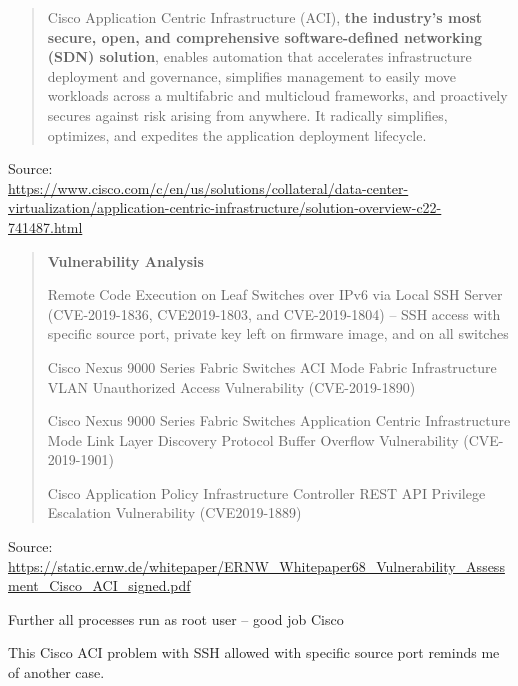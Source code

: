 \documentclass[Screen16to9,17pt]{foils}
\begin{document}


\begin{quote}\footnotesize
Cisco Application Centric Infrastructure (ACI), {\bf the industry’s most secure, open, and comprehensive software-defined networking (SDN) solution}, enables automation that accelerates infrastructure deployment and governance, simplifies management to easily move workloads across a multifabric and multicloud frameworks, and proactively secures against risk arising from anywhere. It radically simplifies, optimizes, and expedites the application deployment lifecycle.
\end{quote}
Source:\\ {\scriptsize\url{https://www.cisco.com/c/en/us/solutions/collateral/data-center-virtualization/application-centric-infrastructure/solution-overview-c22-741487.html}}



\begin{quote}{\bf
Vulnerability Analysis}
\begin{list2}
\item Remote Code Execution on Leaf Switches over IPv6 via Local SSH Server (CVE-2019-1836, CVE2019-1803, and CVE-2019-1804) -- SSH access with specific source port, private key left on firmware image, and on all switches
\item Cisco Nexus 9000 Series Fabric Switches ACI Mode Fabric Infrastructure VLAN Unauthorized Access
Vulnerability (CVE-2019-1890)
\item Cisco Nexus 9000 Series Fabric Switches Application Centric Infrastructure Mode Link Layer Discovery
Protocol Buffer Overflow Vulnerability (CVE-2019-1901)
\item Cisco Application Policy Infrastructure Controller REST API Privilege Escalation Vulnerability (CVE2019-1889)
\end{list2}
\end{quote}
Source: \url{https://static.ernw.de/whitepaper/ERNW_Whitepaper68_Vulnerability_Assessment_Cisco_ACI_signed.pdf}

Further all processes run as root user -- good job Cisco


This Cisco ACI problem with SSH allowed with specific source port reminds me of another case.
\end{document}
